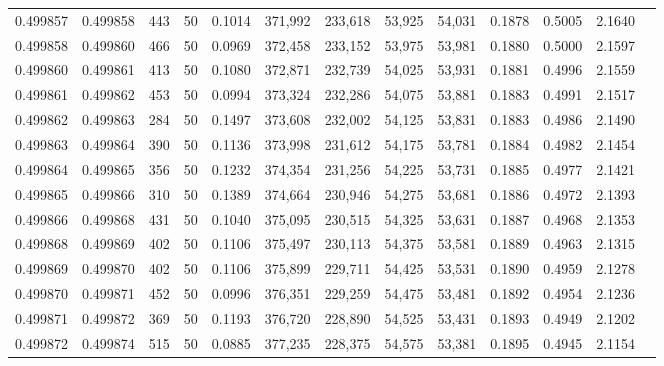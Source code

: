 \begin{tabular}{rrrrrrrrrrrrr}
0.499857 & 0.499858 & 443 &  50 &                                     0.1014 & 371,992 & 233,618 &  53,925 &  54,031 & 0.1878 & 0.5005 & 2.1640 \\
0.499858 & 0.499860 & 466 &  50 &                                     0.0969 & 372,458 & 233,152 &  53,975 &  53,981 & 0.1880 & 0.5000 & 2.1597 \\
0.499860 & 0.499861 & 413 &  50 &                                     0.1080 & 372,871 & 232,739 &  54,025 &  53,931 & 0.1881 & 0.4996 & 2.1559 \\
0.499861 & 0.499862 & 453 &  50 &                                     0.0994 & 373,324 & 232,286 &  54,075 &  53,881 & 0.1883 & 0.4991 & 2.1517 \\
0.499862 & 0.499863 & 284 &  50 &                                     0.1497 & 373,608 & 232,002 &  54,125 &  53,831 & 0.1883 & 0.4986 & 2.1490 \\
0.499863 & 0.499864 & 390 &  50 &                                     0.1136 & 373,998 & 231,612 &  54,175 &  53,781 & 0.1884 & 0.4982 & 2.1454 \\
0.499864 & 0.499865 & 356 &  50 &                                     0.1232 & 374,354 & 231,256 &  54,225 &  53,731 & 0.1885 & 0.4977 & 2.1421 \\
0.499865 & 0.499866 & 310 &  50 &                                     0.1389 & 374,664 & 230,946 &  54,275 &  53,681 & 0.1886 & 0.4972 & 2.1393 \\
0.499866 & 0.499868 & 431 &  50 &                                     0.1040 & 375,095 & 230,515 &  54,325 &  53,631 & 0.1887 & 0.4968 & 2.1353 \\
0.499868 & 0.499869 & 402 &  50 &                                     0.1106 & 375,497 & 230,113 &  54,375 &  53,581 & 0.1889 & 0.4963 & 2.1315 \\
0.499869 & 0.499870 & 402 &  50 &                                     0.1106 & 375,899 & 229,711 &  54,425 &  53,531 & 0.1890 & 0.4959 & 2.1278 \\
0.499870 & 0.499871 & 452 &  50 &                                     0.0996 & 376,351 & 229,259 &  54,475 &  53,481 & 0.1892 & 0.4954 & 2.1236 \\
0.499871 & 0.499872 & 369 &  50 &                                     0.1193 & 376,720 & 228,890 &  54,525 &  53,431 & 0.1893 & 0.4949 & 2.1202 \\
0.499872 & 0.499874 & 515 &  50 &                                     0.0885 & 377,235 & 228,375 &  54,575 &  53,381 & 0.1895 & 0.4945 & 2.1154 \\

\end{tabular}
